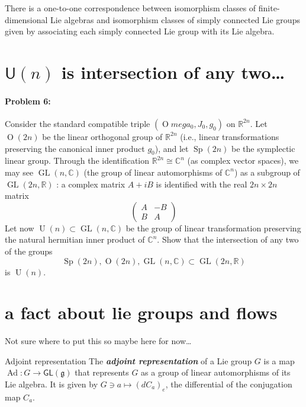 \begin{thm}
	There is a one-to-one correspondence between isomorphism classes of finite-dimensional Lie algebras and isomorphism classes of simply connected Lie groups given by associating each simply connected Lie group with its Lie algebra.
\end{thm}


\section{\(\mathsf{U}(n)\) is intersection of any two…}

 \paragraph{Problem 6:} Consider the standard compatible triple $(\operatorname{O}mega_0,J_0,g_0)$ on $\mathbb{R}^{2n}$. Let $\operatorname{O}(2n)$ be the linear orthogonal group of $\mathbb{R}^{2n}$ (i.e., linear transformations preserving the canonical inner product $g_0$), and let $\operatorname{Sp}(2n)$ be the symplectic linear group. Through the identification $\mathbb{R}^{2n}\cong \mathbb{C}^{n}$ (as complex vector spaces), we may see $\operatorname{GL}(n,\mathbb{C})$ (the group of linear automorphisms of $\mathbb{C}^{n}$) as a subgroup of $\operatorname{GL}(2n,\mathbb{R})$ : a complex matrix $A+iB$ is identified with the real $2n\times 2n$ matrix
 \[\begin{pmatrix}A&-B\\B&A\end{pmatrix}\]
Let now $\operatorname{U}(n)\subset\operatorname{GL}(n,\mathbb{C})$ be the group of linear transformation preserving the natural hermitian inner product of $\mathbb{C}^{n}$. Show that the intersection of any two of the groups
\[\operatorname{Sp}(2n),\operatorname{O}(2n),\operatorname{GL}(n,\mathbb{C})\subset\operatorname{GL}(2n,\mathbb{R})\]
is $\operatorname{U}(n)$.

\section{a fact about lie groups and flows}

Not sure where to put this so maybe here for now…

\begin{thing7}{Adjoint representation}\leavevmode
The \textit{\textbf{adjoint representation}} of a Lie group \(G\) is a map \(\operatorname{Ad}:G \to \mathsf{GL}(\mathfrak{g})\) that represents \(G\) as a group of linear automorphisms of its Lie algebra. It is given by \(G \ni a \mapsto (dC_a)_e\), the differential of the conjugation map \(C_a\).
\end{thing7}

